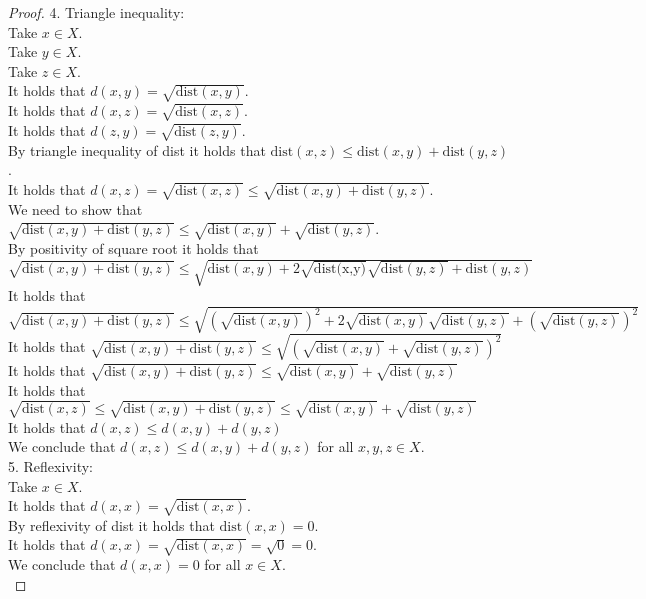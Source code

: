 \documentclass{article}
\theoremstyle{mytheoremstyle}
\theoremstyle{mytheoremstyle}
\theoremstyle{myproblemstyle}
\begin{document}
\begin{proof}
        4. Triangle inequality: \\
        Take $x \in X$. \\
        Take $y \in X$. \\
        Take $z \in X$. \\
        It holds that $d(x,y) = \sqrt{\text{dist}(x,y)}$. \\
        It holds that $d(x,z) = \sqrt{\text{dist}(x,z)}$. \\
        It holds that $d(z,y) = \sqrt{\text{dist}(z,y)}$. \\
        By triangle inequality of dist it holds that $\text{dist}(x,z) \leq \text{dist}(x,y) + \text{dist}(y,z)$. \\
        It holds that $d(x,z) = \sqrt{\text{dist}(x,z)} \leq \sqrt{\text{dist}(x,y) + \text{dist}(y,z)}$. \\
        We need to show that $\sqrt{\text{dist}(x,y) + \text{dist}(y,z)} \leq \sqrt{\text{dist}(x,y)} + \sqrt{\text{dist}(y,z)}$. \\
        By positivity of square root it holds that $\sqrt{\text{dist}(x,y) + \text{dist}(y,z)} \le \sqrt{\text{dist}(x,y) + 2\sqrt{\text{dist(x,y)}}\sqrt{\text{dist}(y,z)} + \text{dist}(y,z)}$ \\
        It holds that $\sqrt{\text{dist}(x,y) + \text{dist}(y,z)} \le \sqrt{\left(\sqrt{\text{dist}(x,y)}\right)^2 + 2\sqrt{\text{dist}(x,y)}\sqrt{\text{dist}(y,z)} + \left(\sqrt{\text{dist}(y,z)}\right)^2}$ \\
        It holds that $\sqrt{\text{dist}(x,y) + \text{dist}(y,z)} \le \sqrt{\left( \sqrt{\text{dist}(x,y)} + \sqrt{\text{dist}(y,z)} \right)^2} $ \\
        It holds that $\sqrt{\text{dist}(x,y) + \text{dist}(y,z)} \le  \sqrt{\text{dist}(x,y)} + \sqrt{\text{dist}(y,z)} $ \\
        It holds that $\sqrt{\text{dist}(x,z)} \le \sqrt{\text{dist}(x,y) + \text{dist}(y,z)} \le \sqrt{\text{dist}(x,y)} + \sqrt{\text{dist}(y,z)} $ \\
        It holds that $d(x,z) \le d(x,y) + d(y,z)$ \\
        We conclude that $d(x,z) \le d(x,y) + d(y,z)$ for all $x,y,z \in X$.\\

        5. Reflexivity: \\
        Take $x \in X$. \\
        It holds that $d(x,x) = \sqrt{\text{dist}(x,x)}$. \\
        By reflexivity of dist it holds that $\text{dist}(x,x) = 0$. \\
        It holds that $d(x,x) = \sqrt{\text{dist}(x,x)} = \sqrt{0} = 0$. \\
        We conclude that $d(x,x) = 0$ for all $x \in X$. \\

    \end{proof}
\end{document}
